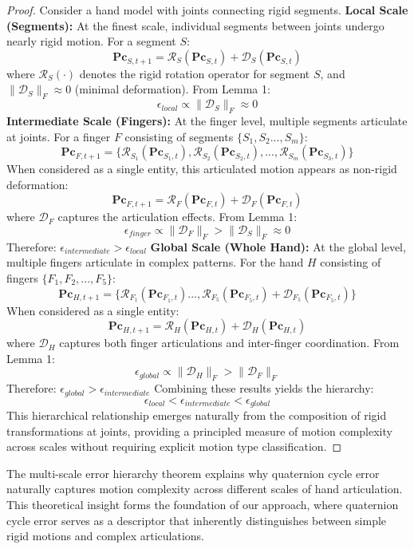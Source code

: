 \documentclass[journal]{IEEEtran}
\theoremstyle{plain}
\begin{document}
\begin{proof}
Consider a hand model with joints connecting rigid segments.
\textbf{Local Scale (Segments):}
At the finest scale, individual segments between joints undergo nearly rigid motion. For a segment $S$:
\[\mathbf{Pc}_{S,t+1} = \mathcal{R}_S(\mathbf{Pc}_{S,t}) + \mathcal{D}_S(\mathbf{Pc}_{S,t})\]
where $\mathcal{R}_S(\cdot)$ denotes the rigid rotation operator for segment $S$, and $\|\mathcal{D}_S\|_F \approx 0$ (minimal deformation). From Lemma 1:
\[\epsilon_{local} \propto \|\mathcal{D}_S\|_F \approx 0\]
\textbf{Intermediate Scale (Fingers):}
At the finger level, multiple segments articulate at joints. For a finger $F$ consisting of segments $\{S_1, S_2...,S_m\}$:
\[\mathbf{Pc}_{F,t+1} = \{\mathcal{R}_{S_1}(\mathbf{Pc}_{S_1,t}), \mathcal{R}_{S_2}(\mathbf{Pc}_{S_2,t}),..., \mathcal{R}_{S_m}(\mathbf{Pc}_{S_3,t})\}\]
When considered as a single entity, this articulated motion appears as non-rigid deformation:
\[\mathbf{Pc}_{F,t+1} = \mathcal{R}_F(\mathbf{Pc}_{F,t}) + \mathcal{D}_F(\mathbf{Pc}_{F,t})\]where $\mathcal{D}_F$ captures the articulation effects. From Lemma 1:
\[\epsilon_{finger} \propto \|\mathcal{D}_F\|_F > \|\mathcal{D}_S\|_F \approx 0\]
Therefore: $\epsilon_{intermediate} > \epsilon_{local}$
\textbf{Global Scale (Whole Hand):}
At the global level, multiple fingers articulate in complex patterns. For the hand $H$ consisting of fingers $\{F_1, F_2, ..., F_5\}$:
{\small
\[\mathbf{Pc}_{H,t+1} = \{\mathcal{R}_{F_1}(\mathbf{Pc}_{F_1,t}) ...,\mathcal{R}_{F_5}(\mathbf{Pc}_{F_5,t}) + \mathcal{D}_{F_5}(\mathbf{Pc}_{F_5,t})\}\]
}
When considered as a single entity:
\[\mathbf{Pc}_{H,t+1} = \mathcal{R}_H(\mathbf{Pc}_{H,t}) + \mathcal{D}_H(\mathbf{Pc}_{H,t})\]
where $\mathcal{D}_H$ captures both finger articulations and inter-finger coordination. From Lemma 1:
\[\epsilon_{global} \propto \|\mathcal{D}_H\|_F > \|\mathcal{D}_F\|_F\]
Therefore: $\epsilon_{global} > \epsilon_{intermediate}$
Combining these results yields the hierarchy:
\[\epsilon_{local} < \epsilon_{intermediate} < \epsilon_{global}\]
This hierarchical relationship emerges naturally from the composition of rigid transformations at joints, providing a principled measure of motion complexity across scales without requiring explicit motion type classification.
\end{proof}
The multi-scale error hierarchy theorem explains why quaternion cycle error naturally captures motion complexity across different scales of hand articulation. This theoretical insight forms the foundation of our approach, where quaternion cycle error serves as a descriptor that inherently distinguishes between simple rigid motions and complex articulations.
\end{document}

